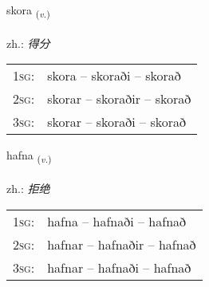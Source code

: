\documentclass[frontgrid, backgrid]{flacards}\usepackage[]{graphicx}\usepackage[]{xcolor}
\begin{document}
\renewcommand{\flhead}{\vskip5pt \fboxsep=0pt {\small\bfseries\footnotesize Sagnorð | 动词}}
\renewcommand{\fcfoot}{\vskip5pt \fboxsep=0pt \hspace{2pt}{\small\bfseries\footnotesize 1K}}

\renewcommand{\blhead}{\vskip5pt {\small\bfseries\footnotesize Sagnorð | 动词 }}
\renewcommand{\bcfoot}{\vskip5pt \hspace{2pt}{\small\bfseries\footnotesize 1K}}


{skora \small{\textsubscript{(\textit{v.})}} \\[1ex] %
\textphonetic{[skɔːra]} \\
zh.: \emph{得分} \\  [2ex]
\renewcommand*{\arraystretch}{0.8}
\begin{tabular}{p{1cm}l}
\textsc{1sg}: & skora -- skoraði -- skorað \\ 
\textsc{2sg}: & skorar -- skoraðir -- skorað \\ 
\textsc{3sg}: & skorar -- skoraði -- skorað \\ 
\end{tabular}
}

\renewcommand{\flhead}{\vskip5pt \fboxsep=0pt {\small\bfseries\footnotesize Sagnorð | 动词}}
\renewcommand{\fcfoot}{\vskip5pt \fboxsep=0pt \hspace{2pt}{\small\bfseries\footnotesize 1K}}

\renewcommand{\blhead}{\vskip5pt {\small\bfseries\footnotesize Sagnorð | 动词 }}
\renewcommand{\bcfoot}{\vskip5pt \hspace{2pt}{\small\bfseries\footnotesize 1K}}


{hafna \small{\textsubscript{(\textit{v.})}} \\[1ex] %
\textphonetic{[hapna]} \\
zh.: \emph{拒绝} \\  [2ex]
\renewcommand*{\arraystretch}{0.8}
\begin{tabular}{p{1cm}l}
\textsc{1sg}: & hafna -- hafnaði -- hafnað \\ 
\textsc{2sg}: & hafnar -- hafnaðir -- hafnað \\ 
\textsc{3sg}: & hafnar -- hafnaði -- hafnað \\ 
\end{tabular}
}
\end{document}
